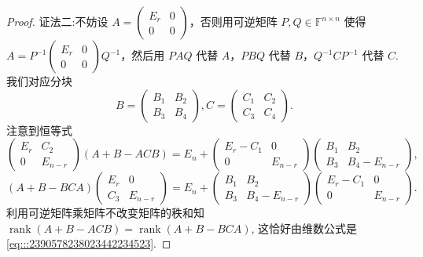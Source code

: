 \documentclass[../../main.tex]{subfiles}%
\begin{document}
\begin{proof}
{\color{blue}证法二:}不妨设 $A = \begin{pmatrix} E_r & 0 \\ 0 & 0 \end{pmatrix}$，否则用可逆矩阵 $P, Q \in \mathbb{F}^{n \times n}$ 使得 $A = P^{-1} \begin{pmatrix} E_r & 0 \\ 0 & 0 \end{pmatrix} Q^{-1}$，然后用 $PAQ$ 代替 $A$，$PBQ$ 代替 $B$，$Q^{-1}CP^{-1}$ 代替 $C$. 我们对应分块
\[
B = \begin{pmatrix} B_1 & B_2 \\ B_3 & B_4 \end{pmatrix}, C = \begin{pmatrix} C_1 & C_2 \\ C_3 & C_4 \end{pmatrix}.
\]
注意到恒等式
\[
\begin{pmatrix}
E_r & C_2 \\
0 & E_{n - r}
\end{pmatrix}(A + B - ACB) = E_n + \begin{pmatrix}
E_r - C_1 & 0 \\
0 & E_{n - r}
\end{pmatrix}\begin{pmatrix}
B_1 & B_2 \\
B_3 & B_4 - E_{n - r}
\end{pmatrix},
\]
\[
(A + B - BCA)\begin{pmatrix}
E_r & 0 \\
C_3 & E_{n - r}
\end{pmatrix} = E_n + \begin{pmatrix}
B_1 & B_2 \\
B_3 & B_4 - E_{n - r}
\end{pmatrix}\begin{pmatrix}
E_r - C_1 & 0 \\
0 & E_{n - r}
\end{pmatrix}.
\]
利用可逆矩阵乘矩阵不改变矩阵的秩和知 $\operatorname{rank}(A + B - ACB) = \operatorname{rank}(A + B - BCA)$, 这恰好由维数公式是\eqref{eq:::2390578238023442234523}. 
\end{proof}
\end{document}
